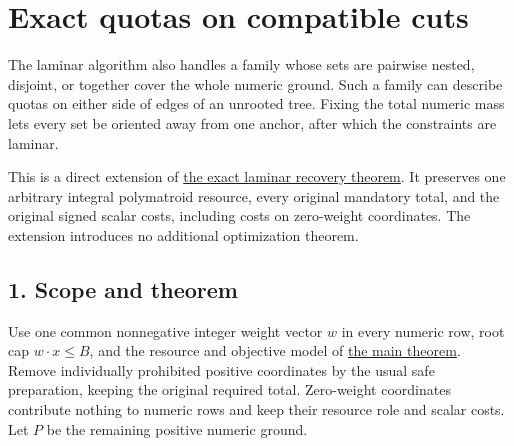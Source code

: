 
\hypertarget{af-3beb839889-exact-quotas-on-compatible-cuts}{%
\section{Exact quotas on compatible cuts}\label{af-3beb839889-exact-quotas-on-compatible-cuts}}

The laminar algorithm also handles a family whose sets are pairwise nested, disjoint, or together cover the whole numeric ground. Such a family can describe quotas on either side of edges of an unrooted tree. Fixing the total numeric mass lets every set be oriented away from one anchor, after which the constraints are laminar.

This is a direct extension of \href{https://github.com/icekylinx/algorithm-frontier/blob/main/problems/weighted-prefix-quota-frontier/manuscripts/laminar-dominant-weight-recovery.md}{the exact laminar recovery theorem}. It preserves one arbitrary integral polymatroid resource, every original mandatory total, and the original signed scalar costs, including costs on zero-weight coordinates. The extension introduces no additional optimization theorem.

\hypertarget{af-3beb839889-scope-and-theorem}{%
\subsection{1. Scope and theorem}\label{af-3beb839889-scope-and-theorem}}

Use one common nonnegative integer weight vector \(w\) in every numeric row, root cap \(w\cdot x\le B\), and the resource and objective model of \href{https://github.com/icekylinx/algorithm-frontier/blob/main/problems/weighted-prefix-quota-frontier/proof.md\#1-model-and-theorem}{the main theorem}. Remove individually prohibited positive coordinates by the usual safe preparation, keeping the original required total. Zero-weight coordinates contribute nothing to numeric rows and keep their resource role and scalar costs. Let \(P\) be the remaining positive numeric ground.

